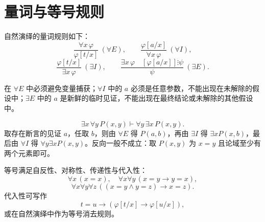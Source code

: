 \section{量词与等号规则}\label{sec:rules}

自然演绎的量词规则如下：
\[
\frac{\forall x\,\varphi}{\varphi[t/x]}\ (\forall E),\qquad
\frac{\varphi[a/x]}{\forall x\,\varphi}\ (\forall I),
\]
\[
\frac{\varphi[t/x]}{\exists x\,\varphi}\ (\exists I),\qquad
\frac{\exists x\,\varphi\quad [\varphi[a/x]]\vdots\psi}{\psi}\ (\exists E).
\]

在 $\forall E$ 中必须避免变量捕获；$\forall I$ 中的 $a$ 必须是任意参数，不能出现在未解除的假设中；$\exists E$ 中的 $a$ 是新鲜的临时见证，不能出现在最终结论或未解除的其他假设中。

\begin{example}
\[
\exists x\,\forall y\,P(x,y)\vdash\forall y\,\exists x\,P(x,y).
\]
取存在断言的见证 $a$，任取 $b$，则由 $\forall E$ 得 $P(a,b)$，再由 $\exists I$ 得 $\exists xP(x,b)$，最后由 $\forall I$ 得 $\forall y\exists xP(x,y)$。反向一般不成立：取 $P(x,y)$ 为 $x=y$ 且论域至少有两个元素即可。
\end{example}

等号满足自反性、对称性、传递性与代入性：
\[
\forall x\,(x=x),
\quad \forall x\forall y\,(x=y\to y=x),
\]
\[
\forall x\forall y\forall z\,((x=y\land y=z)\to x=z).
\]
代入性可写作
\[
t=u\to(\varphi[t/x]\to\varphi[u/x]),
\]
或在自然演绎中作为等号消去规则。
